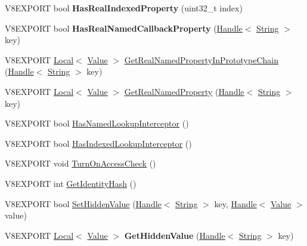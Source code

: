 \begin{DoxyCompactItemize}
\item 
\hypertarget{classv8_1_1_object_ae1835a3c20cb3bf485e575f4c82aa5af}{}V8\+E\+X\+P\+O\+R\+T bool {\bfseries Has\+Real\+Indexed\+Property} (uint32\+\_\+t index)\label{classv8_1_1_object_ae1835a3c20cb3bf485e575f4c82aa5af}

\item 
\hypertarget{classv8_1_1_object_a7d3dbdffefc92245e04b0828aa0e770d}{}V8\+E\+X\+P\+O\+R\+T bool {\bfseries Has\+Real\+Named\+Callback\+Property} (\hyperlink{classv8_1_1_handle}{Handle}$<$ \hyperlink{classv8_1_1_string}{String} $>$ key)\label{classv8_1_1_object_a7d3dbdffefc92245e04b0828aa0e770d}

\item 
V8\+E\+X\+P\+O\+R\+T \hyperlink{classv8_1_1_local}{Local}$<$ \hyperlink{classv8_1_1_value}{Value} $>$ \hyperlink{classv8_1_1_object_ab955e6c94dc6bf3e65e5355eb3d2d876}{Get\+Real\+Named\+Property\+In\+Prototype\+Chain} (\hyperlink{classv8_1_1_handle}{Handle}$<$ \hyperlink{classv8_1_1_string}{String} $>$ key)
\item 
V8\+E\+X\+P\+O\+R\+T \hyperlink{classv8_1_1_local}{Local}$<$ \hyperlink{classv8_1_1_value}{Value} $>$ \hyperlink{classv8_1_1_object_a353c1568c4de35ef3f3065b5a4aecc50}{Get\+Real\+Named\+Property} (\hyperlink{classv8_1_1_handle}{Handle}$<$ \hyperlink{classv8_1_1_string}{String} $>$ key)
\item 
V8\+E\+X\+P\+O\+R\+T bool \hyperlink{classv8_1_1_object_ad0791109068a7816d65a06bbc9f6f870}{Has\+Named\+Lookup\+Interceptor} ()
\item 
V8\+E\+X\+P\+O\+R\+T bool \hyperlink{classv8_1_1_object_afd36ea440a254335bde065a4ceafffb3}{Has\+Indexed\+Lookup\+Interceptor} ()
\item 
V8\+E\+X\+P\+O\+R\+T void \hyperlink{classv8_1_1_object_aa2299eda3240be1e76b7d5c2af7a6bbc}{Turn\+On\+Access\+Check} ()
\item 
V8\+E\+X\+P\+O\+R\+T int \hyperlink{classv8_1_1_object_a5309f7a349feb906a05ee45b6feeaab1}{Get\+Identity\+Hash} ()
\item 
V8\+E\+X\+P\+O\+R\+T bool \hyperlink{classv8_1_1_object_a0040e3012d621b25f580407bacebf95f}{Set\+Hidden\+Value} (\hyperlink{classv8_1_1_handle}{Handle}$<$ \hyperlink{classv8_1_1_string}{String} $>$ key, \hyperlink{classv8_1_1_handle}{Handle}$<$ \hyperlink{classv8_1_1_value}{Value} $>$ value)
\item 
\hypertarget{classv8_1_1_object_af3634e494683aee31ea57ca493cc016a}{}V8\+E\+X\+P\+O\+R\+T \hyperlink{classv8_1_1_local}{Local}$<$ \hyperlink{classv8_1_1_value}{Value} $>$ {\bfseries Get\+Hidden\+Value} (\hyperlink{classv8_1_1_handle}{Handle}$<$ \hyperlink{classv8_1_1_string}{String} $>$ key)\label{classv8_1_1_object_af3634e494683aee31ea57ca493cc016a}


\end{DoxyCompactItemize}
